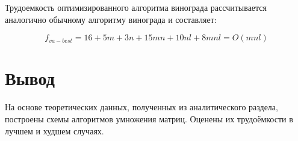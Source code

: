 Трудоемкость оптимизированного алгоритма винограда рассчитывается аналогично обычному алгоритму винограда и составляет:

\begin{equation}
	\label{for:good_impr}
	f_{va-best} = 16 + 5m + 3n + 15mn + 10nl + 8mnl = O(mnl)
\end{equation}

\section*{Вывод}
На основе теоретических данных, полученных из аналитического раздела, построены схемы алгоритмов умножения матриц.  Оценены их трудоёмкости в лучшем и худшем случаях.
